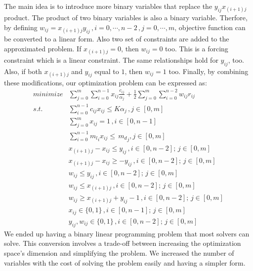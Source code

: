 \documentclass[lettersize,journal]{IEEEtran}
\begin{document}
The main idea is to introduce more binary variables that replace the $y_{ij}x_{(i+1)j}$ product. The product of two binary variables is also a binary variable. Therfore, by defining $w_{ij} = x_{(i+1)j}y_{ij} \, , i=0,\cdots,n-2 \, , j=0,\cdots,m$, objective function can be converted to a linear form. Also two set of constraints are added to the approximated problem. If $x_{(i+1)j} = 0$, then $w_{ij} = 0$ too. This is a forcing constraint which is a linear constraint. The same relationships hold for $y_{ij}$, too. Also, if both $x_{(i+1)j}$ and $y_{ij}$ equal to $1$, then $w_{ij} = 1$ too. Finally, by combining these modifications, our optimization problem can be expressed as:
\begin{align}
\label{final_form}
minimize &\sum_{j=0}^{m}\sum_{i=0}^{n-1} x_{ij}\frac{c_{ij}}{\alpha_j} + \frac{1}{2}\sum_{j=0}^{m} \sum_{i=0}^{n-2} w_{ij} r_{ij} \\
s.t. \quad & \sum_{i=0}^{n-1} c_{ij} x_{ij} \leq K \alpha_j \, , j \in [0, m] \nonumber \\
\quad & \sum_{j=0}^{m} x_{ij} = 1 \, , i \in [0, n-1] \nonumber \\
\quad & \sum_{i=0}^{n-1} {m_l}_i x_{ij} \leq \, {m_d}_j  , j \in [0, m] \nonumber \\
\quad & x_{(i+1)j}-x_{ij} \leq y_{ij} \, , i \in [0, n-2]; \, j \in [0,m]  \nonumber \\
\quad & x_{(i+1)j}-x_{ij} \geq -y_{ij} \, , i \in [0, n-2]; \, j \in[0,m]  \nonumber \\
\quad & w_{ij} \leq y_{ij} \, , i \in [0, n-2]; \, j \in [0, m]  \nonumber \\
\quad & w_{ij} \leq x_{(i+1)j} \, , i \in [0, n-2]; \, j \in [0, m]  \nonumber \\
\quad & w_{ij} \geq x_{(i+1)j} + y_{ij} - 1 \, , i \in [0, n-2]; \, j \in [0, m]  \nonumber \\
\quad & x_{ij} \in \{0,1\} \, , i \in [0, n-1]; \, j \in [0,m] \nonumber \\
\quad & y_{ij}, w_{ij} \in \{0,1\} \, , i \in [0, n-2]; \, j \in [0,m] \nonumber
\end{align}
We ended up having a binary linear programming problem that most solvers can solve. This conversion involves a trade-off between increasing the optimization space's dimension and simplifying the problem. We increased the number of variables with the cost of solving the problem easily and having a simpler form.
\end{document}
